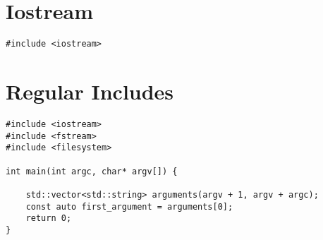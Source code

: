 
\section{Iostream}

\begin{verbatim}
#include <iostream>
\end{verbatim}

\section{Regular Includes}

\begin{verbatim}
#include <iostream>
#include <fstream>
#include <filesystem>

int main(int argc, char* argv[]) {

    std::vector<std::string> arguments(argv + 1, argv + argc);
    const auto first_argument = arguments[0];
    return 0;
}
\end{verbatim}
